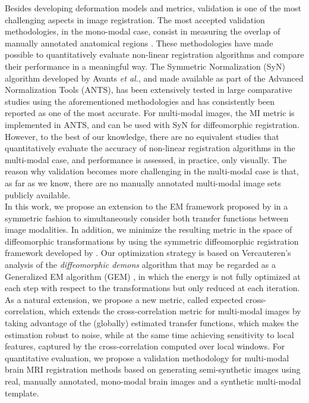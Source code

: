 Besides developing deformation models and metrics, validation is one of the most challenging aspects in image registration. The most accepted validation methodologies, in the mono-modal case, consist in measuring the overlap of manually annotated anatomical regions \citep{Klein2009, Klein2010, Rohlfing2012}. These methodologies have made possible to quantitatively evaluate non-linear registration algorithms and compare their performance in a meaningful way. The Symmetric Normalization (SyN) algorithm developed by Avants {\it et al.}, and made available as part of the Advanced Normalization Tools (ANTS), has been extensively tested in large comparative studies using the aforementioned methodologies and has consistently been reported as one of the most accurate. For multi-modal images, the MI metric is implemented in ANTS, and can be used with SyN for diffeomorphic registration. However, to the best of our knowledge, there are no equivalent studies that quantitatively evaluate the accuracy of non-linear registration algorithms in the multi-modal case, and performance is assessed, in practice, only visually. The reason why validation becomes more challenging in the multi-modal case is that, as far as we know, there are no manually annotated multi-modal image sets publicly available.\\

In this work, we propose an extension to the EM framework proposed by \cite{Arce-santana2014} in a symmetric fashion to simultaneously consider both transfer functions between image modalities. In addition, we minimize the resulting metric in the space of diffeomorphic transformations by using the symmetric diffeomorphic registration framework developed by \cite{Avants2008, Avants2011}. Our optimization strategy is based on Vercauteren's analysis of the \textit{diffeomorphic demons} algorithm \citep{Vercauteren2009} that may be regarded as a Generalized EM algorithm (GEM) \citep{Neal1998}, in which the energy is not fully optimized at each step with respect to the transformations but only reduced at each iteration. As a natural extension, we propose a new metric, called expected cross-correlation, which extends the cross-correlation metric for multi-modal images by taking advantage of the (globally) estimated transfer functions, which makes the estimation robust to noise, while at the same time achieving sensitivity to local features, captured by the cross-correlation computed over local windows. For quantitative evaluation, we propose a validation methodology for multi-modal brain MRI registration methods based on generating semi-synthetic images using real, manually annotated, mono-modal brain images and a synthetic multi-modal template.\\\\

